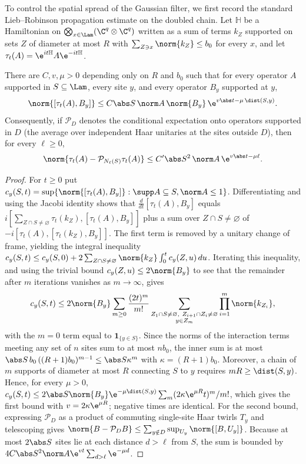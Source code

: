 \precisely
To control the spatial spread of the Gaussian filter, we first record the standard
Lieb--Robinson propagation estimate on the doubled chain. Let
$\mathbb H$ be a Hamiltonian on $\bigotimes_{x\in\Lam}(\C^q\otimes\C^q)$
written as a sum of terms $k_Z$ supported on sets $Z$ of diameter at most
$R$ with $\sum_{Z\ni x}\norm{k_Z}\le b_0$ for every $x$, and let
$\tau_t(A)=\e^{it\mathbb H}A\e^{-it\mathbb H}$.

\begin{lemma}\label{lem:LR}
There are $C,v,\mu>0$ depending only on $R$ and $b_0$ such that for every
operator $A$ supported in $S\subseteq\Lam$, every site $y$, and every
operator $B_y$ supported at $y$,
\[
 \norm{[\tau_t(A),B_y]}\le C\abs S\,\norm A\,\norm{B_y}\,\e^{v\abs t-\mu\,\dist(S,y)} .
\]
Consequently, if $\mathcal P_D$ denotes the conditional expectation onto
operators supported in $D$ (the average over independent Haar unitaries at
the sites outside $D$), then for every $\ell\ge0$,
\[
 \norm{\tau_t(A)-\mathcal P_{N_\ell(S)}\tau_t(A)}\le C'\abs S^2\,\norm A\,\e^{v\abs t-\mu\ell}.
\]
\end{lemma}
\begin{proof}
For $t\ge0$ put $c_y(S,t)=\sup\{\norm{[\tau_t(A),B_y]}:\supp A\subseteq S,\norm A\le1\}$.
Differentiating and using the Jacobi identity shows that $\frac{d}{dt}[\tau_t(A),B_y]$
equals $i[\sum_{Z\cap S\ne\varnothing}\tau_t(k_Z),[\tau_t(A),B_y]]$
plus a sum over $Z\cap S\ne\varnothing$ of $-i[\tau_t(A),[\tau_t(k_Z),B_y]]$. The
first term is removed by a unitary change of frame, yielding the integral inequality
$c_y(S,t)\le c_y(S,0)+2\sum_{Z\cap S\ne\varnothing}\norm{k_Z}\int_0^tc_y(Z,u)\,du$.
Iterating this inequality, and using the trivial bound $c_y(Z,u)\le2\norm{B_y}$ to see
that the remainder after $m$ iterations vanishes as $m\to\infty$, gives
\[
 c_y(S,t)\le 2\norm{B_y}\sum_{m\ge0}\frac{(2t)^m}{m!}
 \sum_{\substack{Z_1\cap S\ne\varnothing,\ Z_{i+1}\cap Z_i\ne\varnothing\\ y\in Z_m}}
 \prod_{i=1}^m\norm{k_{Z_i}},
\]
with the $m=0$ term equal to $\mathbf 1_{\{y\in S\}}$. Since the norms of
the interaction terms meeting any set of $n$ sites sum to at most $nb_0$, the inner
sum is at most $\abs S\,b_0\,((R+1)b_0)^{m-1}\le\abs S\kappa^m$ with
$\kappa=(R+1)b_0$. Moreover, a chain of $m$ supports of diameter at most $R$
connecting $S$ to $y$ requires $mR\ge\dist(S,y)$. Hence,
for every $\mu>0$,
$c_y(S,t)\le 2\abs S\norm{B_y}\e^{-\mu\dist(S,y)}\sum_m(2\kappa\e^{\mu R}t)^m/m!$,
which gives the first bound with $v=2\kappa\e^{\mu R}$; negative times are
identical. For the second
bound, expressing $\mathcal P_D$ as a product of commuting single-site Haar twirls
$T_y$ and telescoping gives
$\norm{B-\mathcal P_DB}\le\sum_{y\notin D}\sup_{U_y}\norm{[B,U_y]}$. Because at most
$2\abs S$ sites lie at each distance $d>\ell$ from $S$, the sum is bounded by
$4C\abs S^2\norm A\e^{vt}\sum_{d>\ell}\e^{-\mu d}$.
\end{proof}

